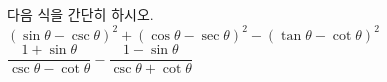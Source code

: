 다음 식을 간단히 하시오.
 $(\sin\theta-\csc\theta)^2+(\cos\theta-\sec\theta)^2-(\tan\theta-\cot\theta)^2$
 $\dfrac{1+\sin\theta}{\csc\theta-\cot\theta}-\dfrac{1-\sin\theta}{\csc\theta+\cot\theta}$
